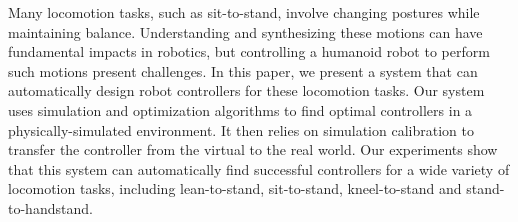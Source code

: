 Many locomotion tasks, such as sit-to-stand, involve changing postures while maintaining balance. Understanding and synthesizing these motions can have fundamental impacts in robotics, but controlling a humanoid robot to perform such motions present challenges. In this paper, we present a system that can automatically design robot controllers for these locomotion tasks. Our system uses simulation and optimization algorithms to find optimal controllers in a physically-simulated environment. It then relies on simulation calibration to transfer the controller from the virtual to the real world. Our experiments show that this system can automatically find successful controllers for a wide variety of locomotion tasks, including lean-to-stand, sit-to-stand, kneel-to-stand and stand-to-handstand.

